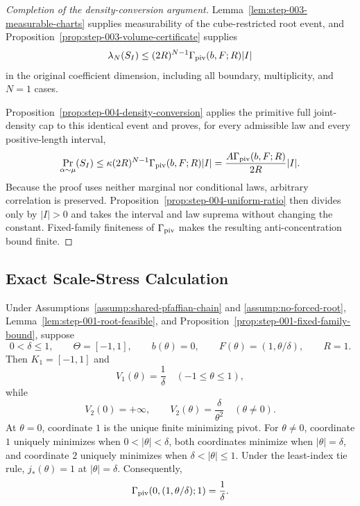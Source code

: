 \begin{proof}[Completion of the density-conversion argument]
Lemma~\ref{lem:step-003-measurable-charts} supplies measurability of the
cube-restricted root event, and
Proposition~\ref{prop:step-003-volume-certificate} supplies
\[
\lambda_N(S_I)
\leq(2R)^{N-1}\Gamma_{\rm piv}(b,F;R)|I|
\]
in the original coefficient dimension, including all boundary,
multiplicity, and $N=1$ cases.

Proposition~\ref{prop:step-004-density-conversion} applies the primitive
full joint-density cap to this identical event and proves, for every
admissible law and every positive-length interval,
\[
\Pr_{\alpha\sim\mu}(S_I)
\leq\kappa(2R)^{N-1}\Gamma_{\rm piv}(b,F;R)|I|
=\frac{A\Gamma_{\rm piv}(b,F;R)}{2R}|I|.
\]
Because the proof uses neither marginal nor conditional laws, arbitrary
correlation is preserved.  Proposition~\ref{prop:step-004-uniform-ratio}
then divides only by $|I|>0$ and takes the interval and law suprema without
changing the constant.  Fixed-family finiteness of $\Gamma_{\rm piv}$ makes
the resulting anti-concentration bound finite.
\end{proof}

\subsection{Exact Scale-Stress Calculation}
\label{app:step-005}

\begin{proposition}
\label{prop:step-005-pivot-profile}
Under Assumptions~\ref{assump:shared-pfaffian-chain} and
\ref{assump:no-forced-root}, Lemma~\ref{lem:step-001-root-feasible}, and
Proposition~\ref{prop:step-001-fixed-family-bound}, suppose
\[
0<\delta\leq1,\qquad
\Theta=[-1,1],\qquad b(\theta)=0,\qquad
F(\theta)=(1,\theta/\delta),\qquad R=1.
\]
Then $K_1=[-1,1]$ and
\begin{equation}
V_1(\theta)=\frac1\delta
\quad(-1\leq\theta\leq1),
\label{eq:step-005-v1}
\end{equation}
while
\begin{equation}
V_2(0)=+\infty,
\qquad
V_2(\theta)=\frac\delta{\theta^2}
\quad(\theta\neq0).
\label{eq:step-005-v2}
\end{equation}
At $\theta=0$, coordinate $1$ is the unique finite minimizing pivot.  For
$\theta\neq0$, coordinate $1$ uniquely minimizes when
$0<|\theta|<\delta$, both coordinates minimize when
$|\theta|=\delta$, and coordinate $2$ uniquely minimizes when
$\delta<|\theta|\leq1$.  Under the least-index tie rule,
$j_*(\theta)=1$ at $|\theta|=\delta$.  Consequently,
\begin{equation}
\Gamma_{\rm piv}(0,(1,\theta/\delta);1)=\frac1\delta.
\label{eq:step-005-exact-gamma}
\end{equation}
\end{proposition}

